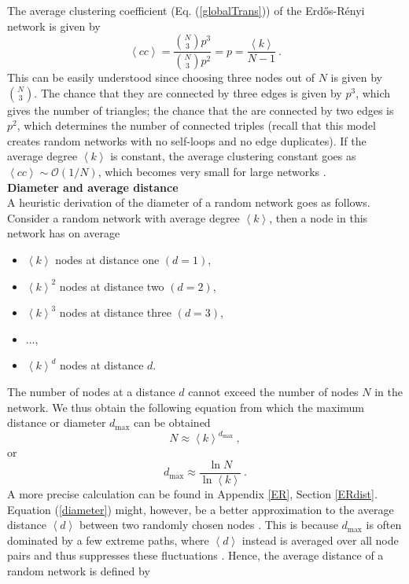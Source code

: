 \documentclass[11 pt , letterpaper , twoside , openright]{book}
\begin{document}
The average clustering coefficient (Eq. (\ref{globalTrans})) of the Erd\H{o}s-R\'{e}nyi network is given by \cite{Clauset2011}
\begin{equation}\label{C}
	\left<cc\right> = \frac{\binom{N}{3}p^3}{\binom{N}{3}p^2} = p = \frac{\left<k\right>}{N-1} \ .
\end{equation}
This can be easily understood since choosing three nodes out of $N$ is given by $\binom{N}{3}$. The chance that they are connected by three edges is given by $p^3$, which gives the number of triangles; the chance that the are connected by two edges is $p^2$, which determines the number of connected triples (recall that this model creates random networks with no self-loops and no edge duplicates). If the average degree $\left<k\right>$ is constant, the average clustering constant goes as $\left<cc\right> \sim \mathcal{O}(1/N)$, which becomes very small for large networks \cite{Clauset2011}. \\
\newline
\textbf{Diameter and average distance}\\
\newline
A heuristic derivation of the diameter of a random network goes as follows. Consider a random network with average degree $\left<k\right>$, then a node in this network has on average \cite{Albert2014}
\begin{itemize}
	\item $\left<k\right>$ nodes at distance one $(d=1)$,
	\item $\left<k\right>^2$ nodes at distance two $(d=2)$,
	\item $\left<k\right>^3$ nodes at distance three $(d=3)$,
	\item ...,
	\item $\left<k\right>^d$ nodes at distance $d$.
\end{itemize}
The number of nodes at a distance $d$ cannot exceed the number of nodes $N$ in the network. We thus obtain the following equation from which the maximum distance or diameter $d_{\textrm{max}}$ can be obtained
\begin{equation}
	N \approx \left<k\right>^{d_{\textrm{max}}} \ ,
\end{equation}
or 
\begin{equation}\label{diameter}
	d_{\textrm{max}} \approx \frac{\ln{N}}{\ln{\left<k\right>}} \ .
\end{equation}
A more precise calculation can be found in Appendix \ref{ER}, Section \ref{ERdist}. Equation (\ref{diameter}) might, however, be a better approximation to the average distance $\left<d\right>$ between two randomly chosen nodes \cite{Albert2014}. This is because $d_{\textrm{max}}$ is often dominated by a few extreme paths, where $\left<d\right>$ instead is averaged over all node pairs and thus suppresses these fluctuations \cite{Albert2014}. Hence, the average distance of a random network is defined by \cite{Albert2014}
\end{document}
